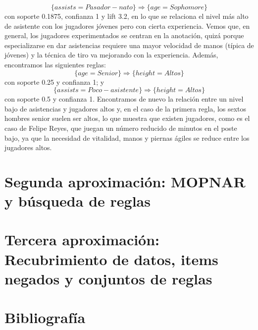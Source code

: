 $$\{assists=Pasador-nato\} \Rightarrow \{age=Sophomore\}$$
con soporte 0.1875, confianza 1 y lift 3.2, en lo que se relaciona el nivel más alto de asistente con los jugadores jóvenes pero con cierta experiencia. Vemos que, en general, los jugadores experimentados se centran en la anotación, quizá porque especializarse en dar asistencias requiere una mayor velocidad de manos (típica de jóvenes) y la técnica de tiro va mejorando con la experiencia. Además, encontramos las siguientes reglas:
$$\{age=Senior\} \Rightarrow \{height=Altos\}$$
con soporte 0.25 y confianza 1; y
$$\{assists=Poco-asistente\} \Rightarrow \{height = Altos\}$$
con soporte 0.5 y confianza 1. Encontramos de nuevo la relación entre un nivel bajo de asistencias y jugadores altos y, en el caso de la primera regla, los sextos hombres senior suelen ser altos, lo que muestra que existen jugadores, como es el caso de Felipe Reyes, que juegan un número reducido de minutos en el poste bajo, ya que la necesidad de vitalidad, manos y piernas ágiles se reduce entre los jugadores altos. 
 
\section{Segunda aproximación: MOPNAR y búsqueda de reglas}



\section{Tercera aproximación: Recubrimiento de datos, items negados y conjuntos de reglas}


\newpage
\section{Bibliografía}




